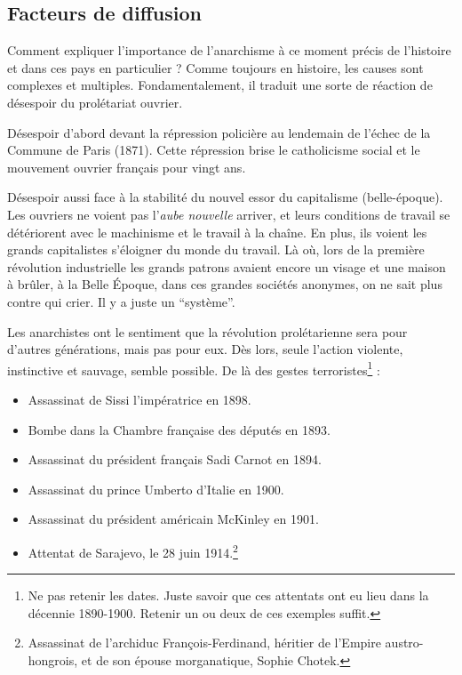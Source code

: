 \documentclass[12pt]{report}
\begin{document}
\subsection{Facteurs de diffusion}

Comment expliquer l'importance de l'anarchisme à ce moment précis de l'histoire et dans ces pays en particulier ? 
Comme toujours en histoire, les causes sont complexes et multiples.
Fondamentalement, il traduit une sorte de réaction de désespoir du prolétariat ouvrier.

Désespoir d’abord devant la répression policière au lendemain de l’échec de la Commune de Paris (1871). Cette répression brise le catholicisme social et le mouvement ouvrier français pour vingt ans.

Désespoir aussi face à la stabilité du nouvel essor du capitalisme (belle-époque).
Les ouvriers ne voient pas l'\emph{aube nouvelle} arriver, et leurs conditions de travail se détériorent avec le machinisme et le travail à la chaîne.
En plus, ils voient les grands capitalistes s'éloigner du monde du travail.
Là où, lors de la première révolution industrielle les grands patrons avaient encore un visage et une maison à brûler, à la Belle Époque, dans ces grandes sociétés anonymes, on ne sait plus contre qui crier. Il y a juste un \enquote{système}. 

Les anarchistes ont le sentiment que la révolution prolétarienne sera pour d'autres générations, mais pas pour eux. 
Dès lors, seule l’action violente, instinctive et sauvage, semble possible. 
De là des gestes terroristes\footnote{Ne pas retenir les dates. Juste savoir que ces attentats ont eu lieu dans la décennie 1890-1900. Retenir un ou deux de ces exemples suffit.} :
\begin{itemize}
	\item Assassinat de Sissi l'impératrice en 1898.
	\item Bombe dans la Chambre française des députés en 1893.
	\item Assassinat du président français Sadi Carnot en 1894.
	\item Assassinat du prince Umberto d’Italie en 1900.
	\item Assassinat du président américain McKinley en 1901.
	\item Attentat de Sarajevo, le 28 juin 1914.\footnote{Assassinat de l'archiduc François-Ferdinand, héritier de l'Empire austro-hongrois, et de son épouse morganatique, Sophie Chotek.}
\end{itemize}
\end{document}
